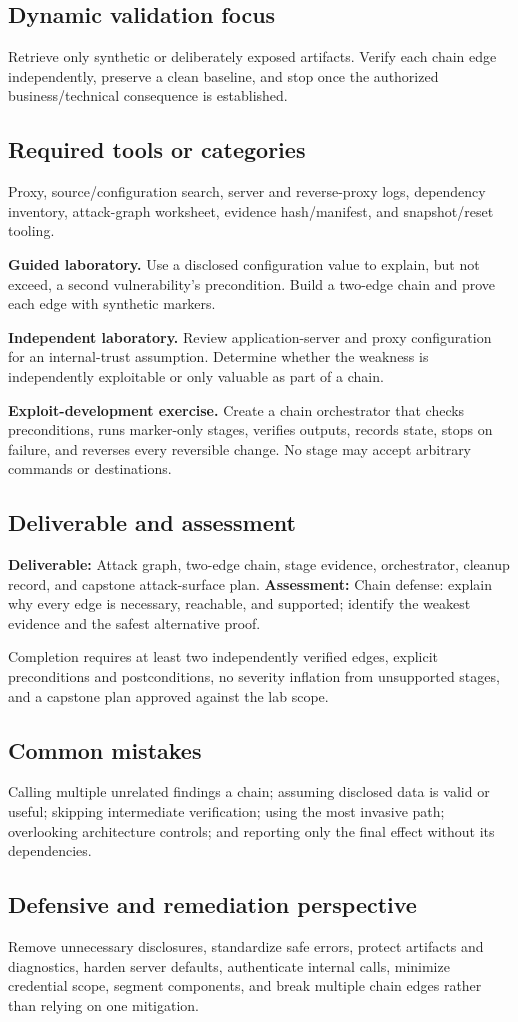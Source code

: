 \documentclass[11pt]{article}
\newcommand{\weekfield}[2]{%
  \Needspace{5\baselineskip}
  \subsection*{#1}
  #2
}
\newcommand{\deliverable}[1]{\textbf{Deliverable:} #1}
\newcommand{\assessment}[1]{\textbf{Assessment:} #1}
\begin{document}
\weekfield{Dynamic validation focus}{Retrieve only synthetic or deliberately
exposed artifacts. Verify each chain edge independently, preserve a clean baseline,
and stop once the authorized business/technical consequence is established.}

\weekfield{Required tools or categories}{Proxy, source/configuration search,
server and reverse-proxy logs, dependency inventory, attack-graph worksheet,
evidence hash/manifest, and snapshot/reset tooling.}

\begin{labbox}
\textbf{Guided laboratory.} Use a disclosed configuration value to explain, but
not exceed, a second vulnerability's precondition. Build a two-edge chain and
prove each edge with synthetic markers.

\textbf{Independent laboratory.} Review application-server and proxy
configuration for an internal-trust assumption. Determine whether the weakness
is independently exploitable or only valuable as part of a chain.

\textbf{Exploit-development exercise.} Create a chain orchestrator that checks
preconditions, runs marker-only stages, verifies outputs, records state, stops on
failure, and reverses every reversible change. No stage may accept arbitrary
commands or destinations.
\end{labbox}

\weekfield{Deliverable and assessment}{\deliverable{Attack graph, two-edge chain,
stage evidence, orchestrator, cleanup record, and capstone attack-surface plan.}
\assessment{Chain defense: explain why every edge is necessary, reachable, and
supported; identify the weakest evidence and the safest alternative proof.}}

\begin{checkpoints}
Completion requires at least two independently verified edges, explicit
preconditions and postconditions, no severity inflation from unsupported stages,
and a capstone plan approved against the lab scope.
\end{checkpoints}

\weekfield{Common mistakes}{Calling multiple unrelated findings a chain; assuming
disclosed data is valid or useful; skipping intermediate verification; using the
most invasive path; overlooking architecture controls; and reporting only the
final effect without its dependencies.}

\weekfield{Defensive and remediation perspective}{Remove unnecessary disclosures,
standardize safe errors, protect artifacts and diagnostics, harden server defaults,
authenticate internal calls, minimize credential scope, segment components, and
break multiple chain edges rather than relying on one mitigation.}
\end{document}
